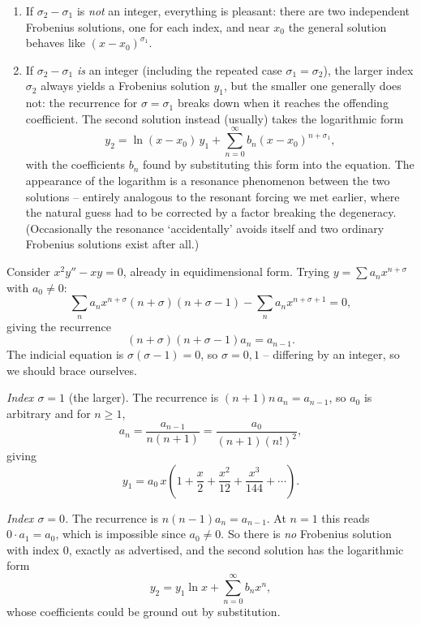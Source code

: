 \begin{enumerate}[label=(\arabic*)]
	\item If $\sigma_2 - \sigma_1$ is \emph{not} an integer, everything is pleasant: there are two independent Frobenius solutions, one for each index, and near $x_0$ the general solution behaves like $(x - x_0)^{\sigma_1}$.
	\item If $\sigma_2 - \sigma_1$ \emph{is} an integer (including the repeated case $\sigma_1 = \sigma_2$), the larger index $\sigma_2$ always yields a Frobenius solution $y_1$, but the smaller one generally does not: the recurrence for $\sigma = \sigma_1$ breaks down when it reaches the offending coefficient. The second solution instead (usually) takes the logarithmic form
	$$
	y_2 = \ln(x - x_0) \, y_1 + \sum_{n = 0}^{\infty} b_n (x - x_0)^{n + \sigma_1},
	$$
	with the coefficients $b_n$ found by substituting this form into the equation. The appearance of the logarithm is a resonance phenomenon between the two solutions -- entirely analogous to the resonant forcing we met earlier, where the natural guess had to be corrected by a factor breaking the degeneracy. (Occasionally the resonance `accidentally' avoids itself and two ordinary Frobenius solutions exist after all.)
\end{enumerate}

\begin{example}
	Consider $x^2 y'' - xy = 0$, already in equidimensional form. Trying $y = \sum a_n x^{n + \sigma}$ with $a_0 \neq 0$:
	$$
	\sum_n a_n x^{n + \sigma}(n + \sigma)(n + \sigma - 1) - \sum_n a_n x^{n + \sigma + 1} = 0,
	$$
	giving the recurrence
	$$
	(n + \sigma)(n + \sigma - 1) a_n = a_{n - 1}.
	$$
	The indicial equation is $\sigma(\sigma - 1) = 0$, so $\sigma = 0, 1$ -- differing by an integer, so we should brace ourselves.

	\emph{Index $\sigma = 1$} (the larger). The recurrence is $(n + 1)n \, a_n = a_{n - 1}$, so $a_0$ is arbitrary and for $n \geq 1$,
	$$
	a_n = \frac{a_{n - 1}}{n(n + 1)} = \frac{a_0}{(n + 1)(n!)^2},
	$$
	giving
	$$
	y_1 = a_0 \, x \left(1 + \frac x2 + \frac{x^2}{12} + \frac{x^3}{144} + \cdots\right).
	$$

	\emph{Index $\sigma = 0$.} The recurrence is $n(n - 1) a_n = a_{n - 1}$. At $n = 1$ this reads $0 \cdot a_1 = a_0$, which is impossible since $a_0 \neq 0$. So there is \emph{no} Frobenius solution with index $0$, exactly as advertised, and the second solution has the logarithmic form
	$$
	y_2 = y_1 \ln x + \sum_{n = 0}^{\infty} b_n x^n,
	$$
	whose coefficients could be ground out by substitution.
\end{example}

